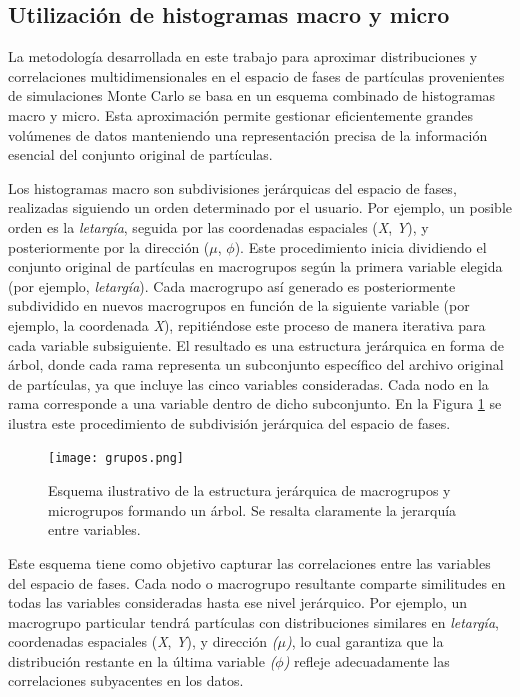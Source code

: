 \subsection{Utilización de histogramas macro y micro}
La metodología desarrollada en este trabajo para aproximar distribuciones y correlaciones multidimensionales en el espacio de fases de partículas provenientes de simulaciones Monte Carlo se basa en un esquema combinado de histogramas macro y micro. Esta aproximación permite gestionar eficientemente grandes volúmenes de datos manteniendo una representación precisa de la información esencial del conjunto original de partículas.

Los histogramas macro son subdivisiones jerárquicas del espacio de fases, realizadas siguiendo un orden determinado por el usuario. Por ejemplo, un posible orden es la \textit{letargía}, seguida por las coordenadas espaciales (\textit{X}, \textit{Y}), y posteriormente por la dirección (\textit{$\mu$}, \textit{$\phi$}). Este procedimiento inicia dividiendo el conjunto original de partículas en macrogrupos según la primera variable elegida (por ejemplo, \textit{letargía}). Cada macrogrupo así generado es posteriormente subdividido en nuevos macrogrupos en función de la siguiente variable (por ejemplo, la coordenada \textit{X}), repitiéndose este proceso de manera iterativa para cada variable subsiguiente. El resultado es una estructura jerárquica en forma de árbol, donde cada rama representa un subconjunto específico del archivo original de partículas, ya que incluye las cinco variables consideradas. Cada nodo en la rama corresponde a  una variable dentro de dicho subconjunto. En la Figura \ref{fig:estructura_jerarquica} se ilustra este procedimiento de subdivisión jerárquica del espacio de fases.

\begin{figure}[h]
    \centering
    \texttt{[image: grupos.png]}
    \caption{Esquema ilustrativo de la estructura jerárquica de macrogrupos y microgrupos formando un árbol. Se resalta claramente la jerarquía entre variables.}
    \label{fig:estructura_jerarquica}
\end{figure}

Este esquema tiene como objetivo capturar las correlaciones entre las variables del espacio de fases. Cada nodo o macrogrupo resultante comparte similitudes en todas las variables consideradas hasta ese nivel jerárquico. Por ejemplo, un macrogrupo particular tendrá partículas con distribuciones similares en \textit{letargía}, coordenadas espaciales (\textit{X}, \textit{Y}), y dirección \textit{($\mu$)}, lo cual garantiza que la distribución restante en la última variable \textit{($\phi$)} refleje adecuadamente las correlaciones subyacentes en los datos.

